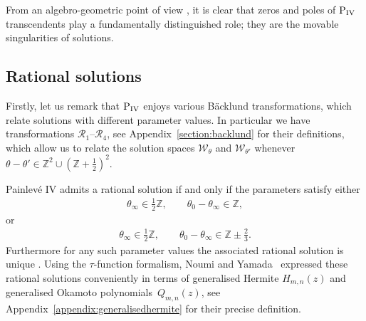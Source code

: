\documentclass[pdftex]{sigma}
\numberwithin{equation}{section}
\begin{document}
From an algebro-geometric point of view \cite{joshimilena, okamoto1979}, it is clear that zeros and poles of ${\rm P}_{\rm IV}$ transcendents play a fundamentally distinguished role; they are the movable singularities of solutions.

\subsection{Rational solutions}
Firstly, let us remark that ${\rm P}_{\rm IV}$ enjoys various B\"acklund transformations, which relate solutions with dif\/ferent parameter values. In particular we have transformations $\mathcal{R}_1$--$\mathcal{R}_4$, see Appendix~\ref{section:backlund} for their def\/initions, which allow us to relate the solution spaces $\mathcal{W}_\theta$ and $\mathcal{W}_{\theta'}$ whenever $\theta-\theta'\in\mathbb{Z}^2\cup (\mathbb{Z}+\tfrac{1}{2})^2$.

Painlev\'e IV admits a rational solution if and only if the parameters satisfy either
\begin{gather}
\theta_\infty\in\tfrac{1}{2}\mathbb{Z}, \qquad \theta_0-\theta_\infty \in\mathbb{Z},\label{eq:parameterhermite}
\end{gather}
or
\begin{gather}
\theta_\infty \in\tfrac{1}{2}\mathbb{Z}, \qquad
\theta_0-\theta_\infty \in\mathbb{Z}\pm \tfrac{2}{3}. \label{eq:parameterokamoto}
\end{gather}
Furthermore for any such parameter values the associated rational solution is unique \cite{gromakrussian,lukasevic,murata}.
Using the $\tau$-function formalism, Noumi and Yamada~\cite{noumiyamada} expressed these rational solutions conveniently in terms of
generalised Hermite $H_{m,n}(z)$ and generalised Okamoto polyno\-mials~$Q_{m,n}(z)$, see Appendix~\ref{appendix:generalisedhermite} for their precise def\/inition.
\end{document}
